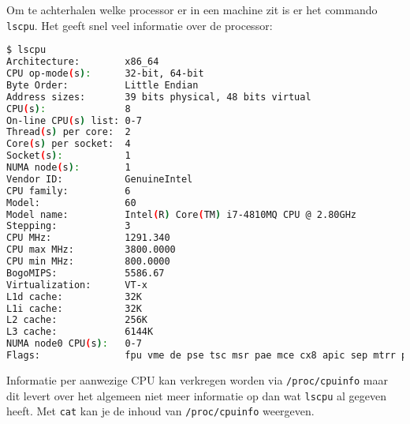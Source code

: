 Om te achterhalen welke processor er in een machine zit is er het commando \texttt{lscpu}. Het geeft snel veel informatie over de processor:
\begin{lstlisting}[language=bash]
$ lscpu
Architecture:        x86_64
CPU op-mode(s):      32-bit, 64-bit
Byte Order:          Little Endian
Address sizes:       39 bits physical, 48 bits virtual
CPU(s):              8
On-line CPU(s) list: 0-7
Thread(s) per core:  2
Core(s) per socket:  4
Socket(s):           1
NUMA node(s):        1
Vendor ID:           GenuineIntel
CPU family:          6
Model:               60
Model name:          Intel(R) Core(TM) i7-4810MQ CPU @ 2.80GHz
Stepping:            3
CPU MHz:             1291.340
CPU max MHz:         3800.0000
CPU min MHz:         800.0000
BogoMIPS:            5586.67
Virtualization:      VT-x
L1d cache:           32K
L1i cache:           32K
L2 cache:            256K
L3 cache:            6144K
NUMA node0 CPU(s):   0-7
Flags:               fpu vme de pse tsc msr pae mce cx8 apic sep mtrr pge mca cmov pat pse36 clflush dts acpi mmx fxsr sse sse2 ss ht tm pbe syscall nx pdpe1gb rdtscp lm constant_tsc arch_perfmon pebs bts rep_good nopl xtopology nonstop_tsc cpuid aperfmperf pni pclmulqdq dtes64 monitor ds_cpl vmx smx est tm2 ssse3 sdbg fma cx16 xtpr pdcm pcid sse4_1 sse4_2 x2apic movbe popcnt tsc_deadline_timer aes xsave avx f16c rdrand lahf_lm abm cpuid_fault epb invpcid_single pti ssbd ibrs ibpb stibp tpr_shadow vnmi flexpriority ept vpid ept_ad fsgsbase tsc_adjust bmi1 avx2 smep bmi2 erms invpcid xsaveopt dtherm ida arat pln pts flush_l1d
\end{lstlisting}
Informatie per aanwezige CPU kan verkregen worden via \texttt{/proc/cpuinfo} maar dit levert over het algemeen niet meer informatie op dan wat \texttt{lscpu} al gegeven heeft. Met \texttt{cat} kan je de inhoud van \texttt{/proc/cpuinfo} weergeven.
